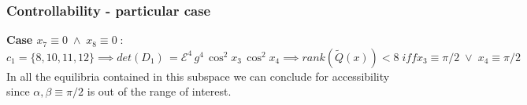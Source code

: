 %
\begin{frame}
\frametitle{Controllability - particular case}
\textbf{Case $x_7 \equiv 0\; \land\; x_8 \equiv 0\;$}:\\[4pt]
$c_1 = \{8,10,11,12\} \implies det(D_1)\,=\mathcal{E}^4\,g^4\,\cos^2 x_{3}\,\cos^2 x_{4} \implies rank(\tilde{Q}(x))<8\; \mathit{iff} x_3\equiv\pi/2\;\lor\;x_4\equiv\pi/2$\\[4pt]
In all the equilibria contained in this subspace we can conclude for accessibility since $\alpha,\beta\equiv\pi/2$ is out of the range of interest.
\end{frame}
